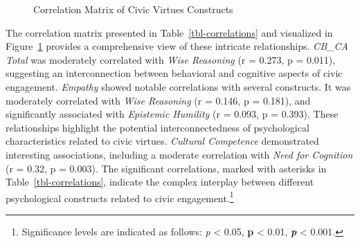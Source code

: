 \documentclass[
  man,
  floatsintext,
  longtable,
  nolmodern,
  notxfonts,
  notimes,
  colorlinks=true,linkcolor=blue,citecolor=blue,urlcolor=blue]{apa7}
\begin{document}
\begin{figure}

\caption{\label{fig-correlation-plot}Correlation Matrix of Civic Virtues
Constructs}


\end{figure}%

The correlation matrix presented in Table~\ref{tbl-correlations} and
visualized in Figure~\ref{fig-correlation-plot} provides a comprehensive
view of these intricate relationships. \emph{CB\_CA Total} was
moderately correlated with \emph{Wise Reasoning} (r = 0.273, p = 0.011),
suggesting an interconnection between behavioral and cognitive aspects
of civic engagement. \emph{Empathy} showed notable correlations with
several constructs. It was moderately correlated with \emph{Wise
Reasoning} (r = 0.146, p = 0.181), and significantly associated with
\emph{Epistemic Humility} (r = 0.093, p = 0.393). These relationships
highlight the potential interconnectedness of psychological
characteristics related to civic virtues. \emph{Cultural Competence}
demonstrated interesting associations, including a moderate correlation
with \emph{Need for Cognition} (r = 0.32, p = 0.003). The significant
correlations, marked with asterisks in Table~\ref{tbl-correlations},
indicate the complex interplay between different psychological
constructs related to civic engagement.\footnote{Significance levels are
  indicated as follows: \emph{p} \textless{} 0.05, \textbf{p}
  \textless{} 0.01, \textbf{\emph{p}} \textless{} 0.001.}
\end{document}
